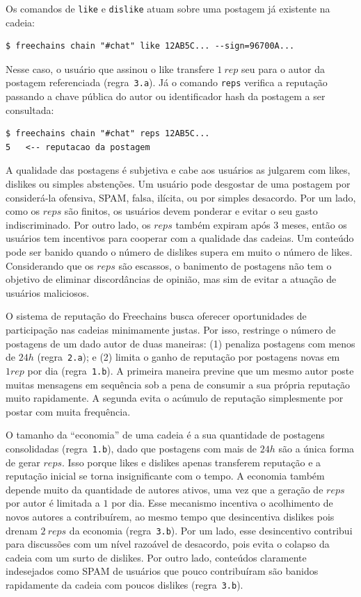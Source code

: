 \documentclass[12pt]{article}
\newcommand{\FC} {Freechains\xspace}
\begin{document}
Os comandos de \texttt{like} e \texttt{dislike} atuam sobre uma postagem já
existente na cadeia:
%
{\footnotesize
\begin{verbatim}
$ freechains chain "#chat" like 12AB5C... --sign=96700A...
\end{verbatim}
}
%
Nesse caso, o usuário que assinou o like transfere $1~rep$ seu para o autor da
postagem referenciada (regra~\texttt{3.a}).
%
Já o comando \texttt{reps} verifica a reputação passando a chave pública do
autor ou identificador hash da postagem a ser consultada:
%
{\footnotesize
\begin{verbatim}
$ freechains chain "#chat" reps 12AB5C...
5   <-- reputacao da postagem
\end{verbatim}
}

A qualidade das postagens é subjetiva e cabe aos usuários as julgarem com
likes, dislikes ou simples abstenções.
Um usuário pode desgostar de uma postagem por considerá-la ofensiva, SPAM,
falsa, ilícita, ou por simples desacordo.
Por um lado, como os $reps$ são finitos, os usuários devem ponderar e evitar o
seu gasto indiscriminado.
Por outro lado, os $reps$ também expiram após 3 meses, então os usuários tem
incentivos para cooperar com a qualidade das cadeias.
Um conteúdo pode ser banido quando o número de dislikes supera em muito o
número de likes.
Considerando que os $reps$ são escassos, o banimento de postagens não tem o
objetivo de eliminar discordâncias de opinião, mas sim de evitar a atuação de
usuários maliciosos.

O sistema de reputação do \FC busca oferecer oportunidades de participação nas
cadeias minimamente justas.
Por isso, restringe o número de postagens de um dado autor de duas maneiras:
    (1) penaliza postagens com menos de $24h$ (regra~\texttt{2.a}); e
    (2) limita o ganho de reputação por postagens novas em $1 rep$ por dia
        (regra~\texttt{1.b}).
A primeira maneira previne que um mesmo autor poste muitas mensagens em
sequência sob a pena de consumir a sua própria reputação muito rapidamente.
A segunda evita o acúmulo de reputação simplesmente por postar com muita
frequência.

O tamanho da ``economia'' de uma cadeia é a sua quantidade de postagens
consolidadas (regra~\texttt{1.b}), dado que postagens com mais de $24h$ são a
única forma de gerar $reps$.
Isso porque likes e dislikes apenas transferem reputação e a reputação inicial
se torna insignificante com o tempo.
A economia também depende muito da quantidade de autores ativos, uma vez que
a geração de $reps$ por autor é limitada a $1$ por dia.
Esse mecanismo incentiva o acolhimento de novos autores a contribuírem, ao
mesmo tempo que desincentiva dislikes pois drenam $2~reps$ da economia
(regra~\texttt{3.b}).
Por um lado, esse desincentivo contribui para discussões com um nível razoável
de desacordo, pois evita o colapso da cadeia com um surto de dislikes.
Por outro lado, conteúdos claramente indesejados como SPAM de usuários que
pouco contribuíram são banidos rapidamente da cadeia com poucos dislikes
(regra~\texttt{3.b}).
\end{document}
